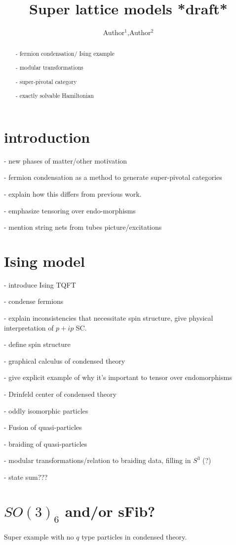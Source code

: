 \documentclass[11pt]{article}
\title{Super lattice models *draft*}
\author{Author$^1$,Author$^{2}$}
\affil{
$^1$ Affiliation1}
\affil{
$^2$ Affiliation2}
\numberwithin{equation}{section}
\begin{document}
\maketitle
\begin{abstract}
- fermion condensation/ Ising example

- modular transformations

- super-pivotal category

- exactly solvable Hamiltonian
 
\end{abstract}

\tableofcontents

\section{introduction}
- new phases of matter/other motivation

- fermion condensation as a method to generate super-pivotal categories

- explain how this differs from previous work. 

- emphasize tensoring over endo-morphisms

-  mention string nets from tubes picture/excitations

\section{Ising model}
- introduce Ising TQFT \cite{Lins1994}

- condense fermions

- explain inconsistencies that necessitate spin structure, give physical interpretation of $p+ip$ SC.

- define spin structure

- graphical calculus of condensed theory

- give explicit example of why it's important to tensor over endomorphisms

- Drinfeld center of condensed theory

- oddly isomorphic particles

- Fusion of quasi-particles

- braiding of quasi-particles 

- modular transformations/relation to braiding data, filling in $S^3$ (?)

- state sum???

\section{$SO(3)_6$ and/or sFib?}
Super example with no $q$ type particles in condensed theory.
\end{document}
